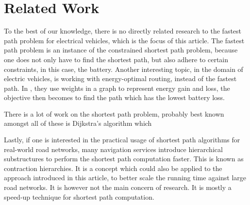 \section{Related Work}\label{sec:relatedwork}
To the best of our knowledge, there is no directly related research to the fastest path problem for electrical vehicles, which is the focus of this article. The fastest path problem is an instance of the constrained shortest path problem, because one does not only have to find the shortest path, but also adhere to certain constraints, in this case, the battery. Another interesting topic, in the domain of electric vehicles, is working with energy-optimal routing, instead of the fastest path. In  \cite{artmeier2010shortest}, they use weights in a graph to represent energy gain and loss, the objective then becomes to find the path which has the lowest battery loss. 

There is a lot of work on the shortest path problem, probably best known amongst all of these is Dijkstra's algorithm \cite{dijkstra1959note} which

Lastly, if one is interested in the practical usage of shortest path algorithms for real-world road networks, many navigation services introduce hierarchical substructures to perform the shortest path computation faster. This is known as contraction hierarchies. It is a concept which could also be applied to the approach introduced in this article, to better scale the running time against large road networks. It is however not the main concern of research. It is mostly a speed-up technique for shortest path computation.